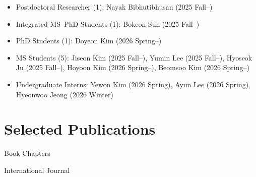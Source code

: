 \documentclass{cv} %
\begin{document}
\begin{itemize}[label=$\cdot$]
  \item Postdoctoral Researcher (1): Nayak Bibhutibhusan (2025 Fall--)
  \vspace{-1mm}
  \item Integrated MS--PhD Students (1): Bokeon Suh (2025 Fall--)
  \vspace{-1mm}
  \item PhD Students (1): Doyeon Kim (2026 Spring--)
  \vspace{-1mm}
  \item MS Students (5): Jiseon Kim (2025 Fall--), Yumin Lee (2025 Fall--), Hyoseok Ju (2025 Fall--), Hoyoon Kim (2026 Spring--), Beomsoo Kim (2026 Spring--)
  \vspace{-1mm}
  \item Undergraduate Interns: Yewon Kim (2026 Spring), Ayun Lee (2026 Spring), Hyeonwoo Jeong (2026 Winter)
\end{itemize}

\section{Selected Publications}


\begin{pubSubsectionNum}{Book Chapters}
  \item \href{http://asrl.utias.utoronto.ca/~tdb/slam/}{}
\end{pubSubsectionNum}

\vspace{-2mm}
\begin{pubSubsectionNum}{International Journal}
  \item {}
  \item {}
  \item {}
  \item {}
  \item {}
  \item {}
  \item {}
  \item {}
\end{pubSubsectionNum}
\end{document}
